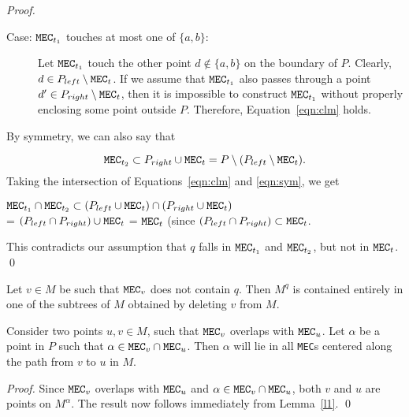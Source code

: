 \documentclass[12pt]{llncs}
\begin{document}
\begin{proof}
\begin{description}
\item[Case: ${\tt MEC}_{t_1}$ touches at most one of $\{a,b\}$:]
Let ${\tt MEC}_{t_1}$ touch the other point $d \not\in \{a,b\}$ on the boundary of $P$. 
Clearly, $d \in P_{left} \setminus {\tt MEC}_t$. If we assume that  
${\tt MEC}_{t_1}$ also passes through a point $d' \in P_{right} \setminus {\tt MEC}_t$, 
then 
it is  
impossible to construct ${\tt MEC}_{t_1}$ without properly enclosing 
some point outside $P$. Therefore, Equation~\ref{eqn:clm} holds.
\end{description}
By symmetry, we can also say that 

\begin{equation}\label{eqn:sym}
{\tt MEC}_{t_2} \subset P_{right} \cup {\tt MEC}_t = P \setminus ( P_{left} \setminus {\tt 
MEC}_t).
\end{equation}
Taking the intersection  of Equations~\ref{eqn:clm} and \ref{eqn:sym}, we get

${\tt MEC}_{t_1} \cap {\tt MEC}_{t_2} \subset ( P_{left} \cup {\tt MEC}_t) \cap 
(P_{right} 
\cup {\tt MEC}_t )$ \\
= $(P_{left} \cap P_{right}) \cup {\tt MEC}_t$ 
= ${\tt MEC}_t$ (since  $(P_{left} \cap P_{right}) \subset {\tt MEC}_t$.

This contradicts our assumption that $q$ falls in ${\tt MEC}_{t_1}$ and ${\tt MEC}
_{t_2}$, 
but not in ${\tt MEC}_t$.
\qed 
\end{proof}



\begin{corollary}\label{l2}
Let $v\in M$ be such that ${\tt MEC}_v$ does not contain $q$. Then $M^q$ is 
contained 
entirely in one 
of the subtrees of $M$ obtained by deleting $v$ from $M$.
\end{corollary}
\begin{corollary}\label{cor:intermediate}
Consider two points $u, v \in M$, such that ${\tt MEC}_v$ overlaps with  ${\tt MEC}_u
$.
Let $\alpha$ be a point in $P$ such that $\alpha \in {\tt MEC}_v \cap {\tt MEC}_u$.
Then $\alpha$ will lie in all {\tt MEC}s centered  along 
the path from $v$ to $u$ in $M$. 
\end{corollary}
\begin{proof}
Since ${\tt MEC}_v$ overlaps with  ${\tt MEC}_u$ and $\alpha \in {\tt MEC}_v \cap {\tt 
MEC}_u$, both $v$ and $u$ are points on $M^\alpha$. The result  now follows 
immediately  from Lemma\ \ref{l1}. 
\qed
\end{proof}
\end{document}
